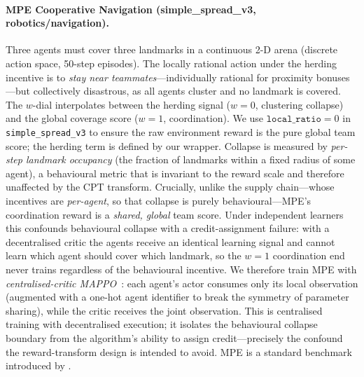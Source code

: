 \documentclass[letterpaper]{article}
\theoremstyle{plain}
\begin{document}
\paragraph{MPE Cooperative Navigation (simple\_spread\_v3, robotics/navigation).}
Three agents must cover three landmarks in a continuous 2-D arena (discrete
action space, 50-step episodes).
The locally rational action under the herding incentive is to
\emph{stay near teammates}---individually rational for proximity bonuses---but
collectively disastrous, as all agents cluster and no landmark is covered.
The $w$-dial interpolates between the herding signal ($w{=}0$, clustering collapse)
and the global coverage score ($w{=}1$, coordination).
We use $\texttt{local\_ratio}{=}0$ in \texttt{simple\_spread\_v3} to ensure the
raw environment reward is the pure global team score; the herding term is defined
by our wrapper.
Collapse is measured by \emph{per-step landmark occupancy} (the fraction of
landmarks within a fixed radius of some agent), a behavioural metric that is
invariant to the reward scale and therefore unaffected by the CPT transform.
Crucially, unlike the supply chain---whose incentives are \emph{per-agent}, so
that collapse is purely behavioural---MPE's coordination reward is a
\emph{shared, global} team score. Under independent learners this confounds
behavioural collapse with a credit-assignment failure: with a decentralised
critic the agents receive an identical learning signal and cannot learn which
agent should cover which landmark, so the $w{=}1$ coordination end never trains
regardless of the behavioural incentive. We therefore train MPE with
\emph{centralised-critic MAPPO}~\citep{yu2022surprising}: each agent's actor
consumes only its local observation (augmented with a one-hot agent identifier
to break the symmetry of parameter sharing), while the critic receives the joint
observation. This is centralised training with decentralised execution; it
isolates the behavioural collapse boundary from the algorithm's ability to assign
credit---precisely the confound the reward-transform design is intended to avoid.
MPE is a standard benchmark introduced by \citet{lowe2017multi}.
\end{document}
